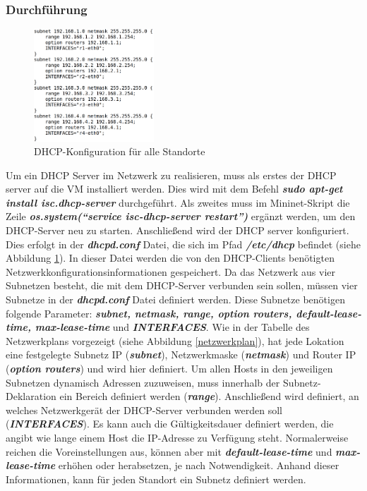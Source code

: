 \documentclass[fontsize=12pt,paper=a4,open=any,parskip=half,
  twoside=false,toc=listof,toc=bibliography,fleqn,leqno,
  captions=nooneline,captions=tableabove,british]{scrbook}
\begin{document}
\subsubsection{Durchführung}
\begin{figure}
 \centering
 \includegraphics[width=0.4\textwidth]{Bilder/dhcp2}
 \caption{DHCP-Konfiguration für alle Standorte}
 \label{dhcp2}
\end{figure}
Um ein DHCP Server im Netzwerk zu realisieren, muss als erstes der DHCP server auf die VM installiert werden. Dies wird mit dem Befehl \textit{\textbf{sudo apt-get install isc.dhcp-server}} durchgeführt. Als zweites muss im Mininet-Skript die Zeile \textit{\textbf{os.system(“service isc-dhcp-server restart”)}} ergänzt werden, um den DHCP-Server neu zu starten. Anschließend wird der DHCP server konfiguriert. Dies erfolgt in der \textit{\textbf{dhcpd.conf}} Datei, die sich im Pfad \textit{\textbf{/etc/dhcp}} befindet (siehe Abbildung \ref{dhcp2}). In dieser Datei werden die von den DHCP-Clients benötigten Netzwerkkonfigurationsinformationen gespeichert. Da das Netzwerk aus vier Subnetzen besteht, die mit dem DHCP-Server verbunden sein sollen, müssen vier Subnetze in der \textit{\textbf{dhcpd.conf}} Datei definiert werden. Diese Subnetze benötigen folgende Parameter: \textit{\textbf{subnet, netmask, range, option routers, default-lease-time, max-lease-time}} und \textit{\textbf{INTERFACES}}. Wie in der Tabelle des Netzwerkplans vorgezeigt (siehe Abbildung \ref{netzwerkplan}), hat jede Lokation eine festgelegte Subnetz IP (\textit{\textbf{subnet}}), Netzwerkmaske (\textit{\textbf{netmask}}) und Router IP (\textit{\textbf{option routers}}) und wird hier definiert. Um allen Hosts in den jeweiligen Subnetzen dynamisch Adressen zuzuweisen, muss innerhalb der Subnetz-Deklaration ein Bereich definiert werden (\textit{\textbf{range}}). Anschließend wird definiert, an welches Netzwerkgerät der DHCP-Server verbunden werden soll (\textit{\textbf{INTERFACES}}). Es kann auch die Gültigkeitsdauer definiert werden, die angibt wie lange einem Host die IP-Adresse zu Verfügung steht. Normalerweise reichen die Voreinstellungen aus, können aber mit \textit{\textbf{default-lease-time}} und \textit{\textbf{max-lease-time}} erhöhen oder herabsetzen, je nach Notwendigkeit. Anhand dieser Informationen, kann für jeden Standort ein Subnetz definiert werden. 
\end{document}
